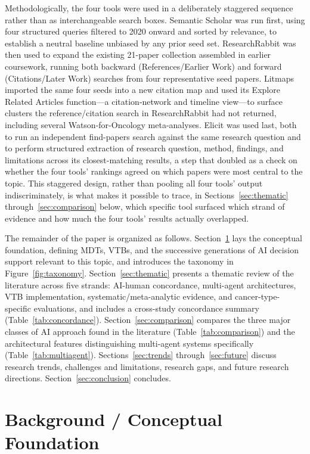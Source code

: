 \documentclass[acmsmall,screen=true,review=false,nonacm=true]{acmart}
\begin{document}
Methodologically, the four tools were used in a deliberately staggered sequence rather than as interchangeable search boxes. Semantic Scholar was run first, using four structured queries filtered to 2020 onward and sorted by relevance, to establish a neutral baseline unbiased by any prior seed set. ResearchRabbit was then used to expand the existing 21-paper collection assembled in earlier coursework, running both backward (References/Earlier Work) and forward (Citations/Later Work) searches from four representative seed papers. Litmaps imported the same four seeds into a new citation map and used its Explore Related Articles function---a citation-network and timeline view---to surface clusters the reference/citation search in ResearchRabbit had not returned, including several Watson-for-Oncology meta-analyses. Elicit was used last, both to run an independent find-papers search against the same research question and to perform structured extraction of research question, method, findings, and limitations across its closest-matching results, a step that doubled as a check on whether the four tools' rankings agreed on which papers were most central to the topic. This staggered design, rather than pooling all four tools' output indiscriminately, is what makes it possible to trace, in Sections~\ref{sec:thematic} through~\ref{sec:comparison} below, which specific tool surfaced which strand of evidence and how much the four tools' results actually overlapped.

The remainder of the paper is organized as follows. Section~\ref{sec:background} lays the conceptual foundation, defining MDTs, VTBs, and the successive generations of AI decision support relevant to this topic, and introduces the taxonomy in Figure~\ref{fig:taxonomy}. Section~\ref{sec:thematic} presents a thematic review of the literature across five strands: AI-human concordance, multi-agent architectures, VTB implementation, systematic/meta-analytic evidence, and cancer-type-specific evaluations, and includes a cross-study concordance summary (Table~\ref{tab:concordance}). Section~\ref{sec:comparison} compares the three major classes of AI approach found in the literature (Table~\ref{tab:comparison}) and the architectural features distinguishing multi-agent systems specifically (Table~\ref{tab:multiagent}). Sections~\ref{sec:trends} through~\ref{sec:future} discuss research trends, challenges and limitations, research gaps, and future research directions. Section~\ref{sec:conclusion} concludes.

\section{Background / Conceptual Foundation}
\label{sec:background}
\end{document}
